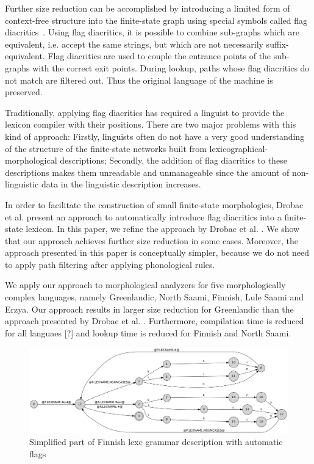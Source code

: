 \documentclass[11pt]{article}
\begin{document}
Further size reduction can be accomplished by introducing a limited
form of context-free structure into the finite-state graph using
special symbols called flag
diacritics~\cite{beesley1998constraining}. Using flag diacritics, it
is possible to combine sub-graphs which are equivalent, i.e. accept
the same strings, but which are not necessarily
suffix-equivalent. Flag diacritics are used to couple the entrance
points of the sub-graphs with the correct exit points. During lookup,
paths whose flag diacritics do not match are filtered out. Thus the
original language of the machine is preserved.

Traditionally, applying flag diacritics has required a linguist to
provide the lexicon compiler with their positions. There are two major
problems with this kind of approach: Firstly, linguists often do not
have a very good understanding of the structure of the finite-state
networks built from lexicographical-morphological descriptions;
Secondly, the addition of flag diacritics to these descriptions makes
them unreadable and unmanageable since the amount of non-linguistic
data in the linguistic description increases.

In order to facilitate the construction of small finite-state
morphologies, Drobac et al.  present an approach
to automatically introduce flag diacritics into a finite-state
lexicon. In this paper, we refine the approach by Drobac et
al. . We show that our approach achieves further
size reduction in some cases. Moreover, the approach presented in this
paper is conceptually simpler, because we do not need to apply path
filtering after applying phonological rules.

We apply our approach to morphological analyzers for five
morphologically complex languages, namely Greenlandic, North Saami,
Finnish, Lule Saami and Erzya. Our approach results in larger size
reduction for Greenlandic than the approach presented by Drobac et
al. . Furthermore, compilation time is reduced
for all languaes [?] and lookup time is reduced for Finnish and North
Saami.

\begin{figure}[!htb]
    \includegraphics[width=\textwidth]{transducer.png}
     \caption{Simplified part of Finnish lexc grammar description with automatic flags
     \label{fig:lexc-fin-flag}}
\end{figure}
\end{document}
